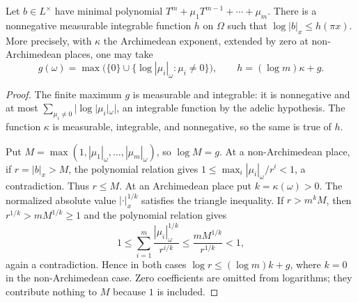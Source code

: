 \begin{lemma}\label{lem:log-root-bound}
\leanok
{}
Let $b\in L^\times$ have minimal polynomial
$T^m+\mu_1T^{m-1}+\cdots+\mu_m$. There is a nonnegative measurable
integrable function $h$ on $\Omega$ such that $\log|b|_x\leq h(\pi x)$.
More precisely, with $\kappa$ the Archimedean exponent, extended by zero
at non-Archimedean places, one may take
\[
 g(\omega)=\max\bigl(\{0\}\cup
       \{\log|\mu_i|_\omega:\mu_i\ne0\}\bigr),\qquad
 h=(\log m)\kappa+g.
\]
\end{lemma}
\begin{proof}
The finite maximum $g$ is measurable and integrable: it is nonnegative
and at most $\sum_{\mu_i\ne0}|\log|\mu_i|_\omega|$, an integrable
function by the adelic hypothesis. The function $\kappa$ is measurable,
integrable, and nonnegative, so the same is true of $h$.

Put $M=\max(1,|\mu_1|_\omega,\ldots,|\mu_m|_\omega)$, so $\log M=g$.
At a non-Archimedean place, if $r=|b|_x>M$, the polynomial relation gives
$1\leq\max_i|\mu_i|_\omega/r^i<1$, a contradiction. Thus $r\leq M$.
At an Archimedean place put $k=\kappa(\omega)>0$. The normalized
absolute value $|\cdot|_x^{1/k}$ satisfies the triangle inequality.
If $r>m^kM$, then $r^{1/k}>mM^{1/k}\geq1$ and the polynomial relation
gives
\[
 1\leq\sum_{i=1}^m\frac{|\mu_i|_\omega^{1/k}}{r^{i/k}}
 \leq\frac{mM^{1/k}}{r^{1/k}}<1,
\]
again a contradiction. Hence in both cases $\log r\leq (\log m)k+g$,
where $k=0$ in the non-Archimedean case. Zero coefficients are omitted
from logarithms; they contribute nothing to $M$ because $1$ is included.
\end{proof}

